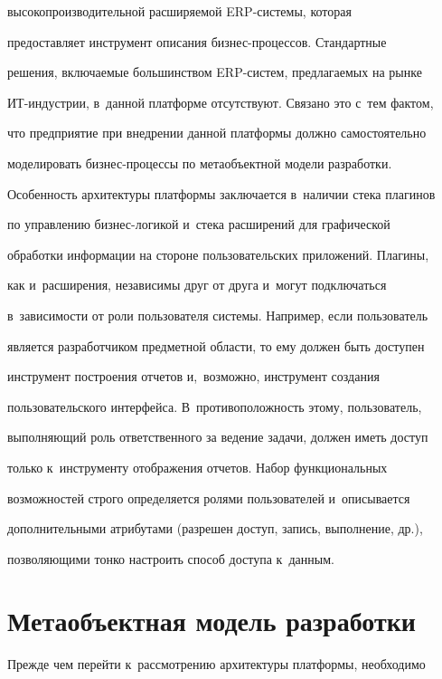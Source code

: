 высокопроизводительной расширяемой ERP-сис\-те\-мы, которая 

предоставляет инструмент описания биз\-нес-про\-цес\-сов. Стандартные 

решения, включаемые большинством ERP-сис\-тем, предлагаемых на рынке  

ИТ-ин\-дуст\-рии, в~данной платформе отсутствуют. Связано это с~тем фактом, 

что предприятие при внедрении данной платформы должно самостоятельно 

моделировать биз\-нес-про\-цес\-сы по метаобъектной модели разработки.

  



  Особенность архитектуры платформы заключается в~наличии стека плагинов 

по управлению биз\-нес-ло\-ги\-кой и~стека расширений для графической 

обработки информации на стороне пользовательских приложений. Плагины, 

как и~расширения, независимы друг от друга и~могут подключаться 

в~зависимости от роли пользователя системы. Например, если пользователь 

является разработчиком предметной области, то ему должен быть доступен 

инструмент построения отчетов и,~возможно, инструмент создания 

пользовательского интерфейса. В~противоположность этому, пользователь, 

выполняющий роль ответственного за ведение задачи, должен иметь доступ 

только к~инструменту отображения отчетов. Набор функциональных 

возможностей строго определяется ролями пользователей и~описывается 

дополнительными атрибутами (разрешен доступ, запись, выполнение, др.), 

позволяющими тонко настроить способ доступа к~данным.

  

\section{Метаобъектная модель разработки}



  Прежде чем перейти к~рассмотрению архитектуры платформы, необходимо 

